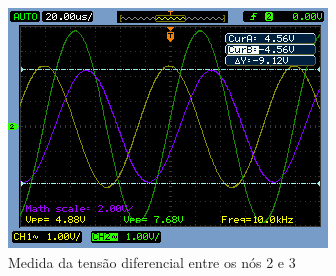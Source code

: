 \documentclass[a4paper]{article} %
\begin{document}
\begin{figure}[h!]
\begin{centering}
\includegraphics[scale=0.7]{Imagens/45} \caption{Medida da tensão diferencial entre os nós 2 e 3 \label{fig:Fig-45}}
\par\end{centering}
\end{figure}

\end{document}
